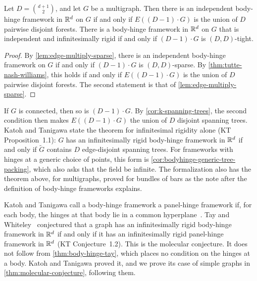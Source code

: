 \begin{theorem}
  \label{thm:body-hinge-tay}
  \leanok
  Let $D = \binom{d+1}{2}$, and let $G$ be a multigraph. Then there is
  an independent body-hinge framework in ${\mathbb{R}}^d$ on $G$ if and only if
  $E((D-1)\cdot G)$ is the union of $D$ pairwise disjoint forests. There is a body-hinge framework in ${\mathbb{R}}^d$ on $G$ that is
  independent and infinitesimally rigid if and only if $(D-1)\cdot G$
  is $(D, D)$-tight.
\end{theorem}
\begin{proof}
  \leanok
  By \cref{lem:edge-multiply-sparse}, there is an independent
  body-hinge framework on $G$ if and only if $(D-1)\cdot G$ is
  $(D, D)$-sparse. By \cref{thm:tutte-nash-williams}, this holds if and
  only if $E((D-1)\cdot G)$ is the union of $D$ pairwise disjoint
  forests. The second statement is that of
  \cref{lem:edge-multiply-sparse}.
\end{proof}

If $G$ is connected, then so is $(D-1)\cdot G$. By
\cref{cor:k-spanning-trees}, the second condition then makes
$E((D-1)\cdot G)$ the union of $D$ disjoint spanning trees. Katoh and
Tanigawa state the theorem for infinitesimal rigidity alone (KT
Proposition~1.1): $G$ has an infinitesimally rigid body-hinge framework
in ${\mathbb{R}}^d$ if and only if $\tilde G$ contains $D$ edge-disjoint spanning
trees. For frameworks with hinges at a generic choice of points,
this form is \cref{cor:bodyhinge-generic-tree-packing}, which
also asks that the field be infinite. The formalization also has the theorem above, for multigraphs,
proved for bundles of bars as the note after the definition of
body-hinge frameworks explains.

Katoh and Tanigawa call a body-hinge framework a panel-hinge framework
if, for each body, the hinges at that body lie in a common
hyperplane~\cite[\S1]{katohTanigawa2011}. Tay and
Whiteley~\cite{tayWhiteley1984} conjectured that a graph has an
infinitesimally rigid body-hinge framework in ${\mathbb{R}}^d$ if and only if it
has an infinitesimally rigid panel-hinge framework in ${\mathbb{R}}^d$ (KT
Conjecture~1.2). This is the molecular conjecture. It does not follow
from \cref{thm:body-hinge-tay}, which places no condition on the hinges
at a body. Katoh and Tanigawa proved it, and we prove its case of
simple graphs in \cref{thm:molecular-conjecture}, following them.
